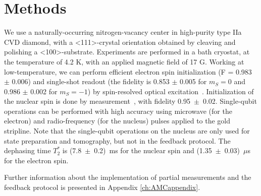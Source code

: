\section{Methods}
We use a naturally-occurring nitrogen-vacancy center in high-purity type IIa CVD diamond, with a \textless 111\textgreater-crystal orientation obtained by cleaving and polishing a \textless100\textgreater -substrate. Experiments are performed in a bath cryostat, at the temperature of 4.2 K, with an applied magnetic field of 17 G. Working at low-temperature, we can perform efficient electron spin initialization (F = 0.983 $\pm$ 0.006) and single-shot readout (the fidelity is 0.853 $\pm$ 0.005 for $m_S = 0$ and 0.986 $\pm$ 0.002 for $m_S = -1$) by spin-resolved optical excitation~\cite{Robledo_Nature_2011}. Initialization of the nuclear spin is done by measurement~\cite{Robledo_Nature_2011}, with fidelity  0.95~$\pm$~0.02. Single-qubit operations can be performed with high accuracy using microwave (for the electron) and radio-frequency (for the nucleus) pulses applied to the gold stripline. Note that the single-qubit operations on the nucleus are only used for state preparation and tomography, but not in the feedback protocol. The dephasing time $T_2^*$ is (7.8~$\pm$~0.2)~ms for the nuclear spin and (1.35~$\pm$~0.03)~$\mu$s for the electron spin. 

Further information about the implementation of partial measurements and the feedback protocol is presented in Appendix \ref{ch:AMCappendix}.
\newpage





